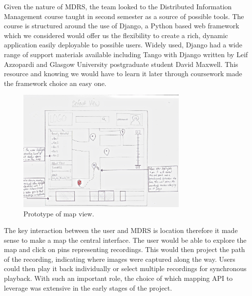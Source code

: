 \documentclass{l3proj}
\begin{document}

Given the nature of MDRS, the team looked to the Distributed Information Management course taught in second semester as a source of possible tools. The course is structured around the use of Django, a Python based web framework which we considered  would offer us the flexibility to create a rich, dynamic application easily deployable to possible users. Widely used, Django had a wide range of support materials available including Tango with Django written by Leif Azzopardi and Glasgow University postgraduate student David Maxwell. This resource and knowing we would have to learn it later through coursework made the framework choice an easy one.

\begin{figure}[ht!]
\centering
\includegraphics[width=0.75\textwidth]{images/web-map-view.jpg}
\caption{Prototype of map view.}
\end{figure}

The key interaction between the user and MDRS is location therefore it made sense to make a map the central interface. The user would be able to explore the map and click on pins representing recordings. This would then project the path of the recording, indicating where images were captured along the way. Users could then play it back individually or select multiple recordings for synchronous playback. With such an important role, the choice of which mapping API to leverage was extensive in the early stages of the project.
\end{document}
